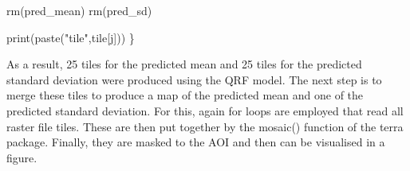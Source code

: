 \documentclass[
  10pt,
  b5paper,
  oneside]{book}
\newenvironment{Shaded}{\begin{snugshade}}{\end{snugshade}}
\newcommand{\FunctionTok}[1]{\textcolor[rgb]{0.00,0.00,0.00}{#1}}
\newcommand{\NormalTok}[1]{#1}
\newcommand{\StringTok}[1]{\textcolor[rgb]{0.31,0.60,0.02}{#1}}
\begin{document}
\begin{Shaded}
\begin{Highlighting}[]
  \FunctionTok{rm}\NormalTok{(pred\_mean)}
  \FunctionTok{rm}\NormalTok{(pred\_sd)}
  
  
  \FunctionTok{print}\NormalTok{(}\FunctionTok{paste}\NormalTok{(}\StringTok{"tile"}\NormalTok{,tile[j]))}
\NormalTok{\}}
\end{Highlighting}
\end{Shaded}

As a result, 25 tiles for the predicted mean and 25 tiles for the predicted standard deviation were produced using the QRF model. The next step is to merge these tiles to produce a map of the predicted mean and one of the predicted standard deviation. For this, again for loops are employed that read all raster file tiles. These are then put together by the mosaic() function of the terra package. Finally, they are masked to the AOI and then can be visualised in a figure.
\end{document}
